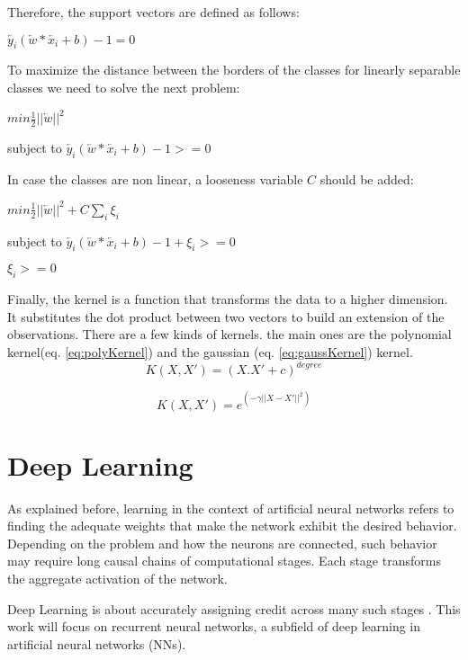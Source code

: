 Therefore, the support vectors are defined as follows: \\
\centerline{$\overleftarrow{y_i} (\overleftarrow{w}*\overleftarrow{x_i}+b)-1=0$\\}

To maximize the distance between the borders of the classes for linearly separable classes we need to solve the next problem:

\centerline{$min \frac{1}{2}||\overleftarrow{w}||^2$\\}
\centerline{subject to $\overleftarrow{y_i} (\overleftarrow{w}*\overleftarrow{x_i}+b)-1>=0$ \\}

In case the classes are non linear, a looseness variable $C$ should be added: \\
\centerline{$min \frac{1}{2}||\overleftarrow{w}||^2+C\sum_{i}\xi_i$\\}
\centerline{subject to $\overleftarrow{y_i} (\overleftarrow{w}*\overleftarrow{x_i}+b)-1+\xi_i>=0$\\}
\centerline{$\xi_i>=0$}

Finally, the kernel is a function that transforms the data to a higher dimension. It substitutes the dot product between two vectors to build an extension of the observations. There are a few kinds of kernels. the main ones are the polynomial kernel(eq. \ref{eq:polyKernel}) and the gaussian (eq. \ref{eq:gaussKernel}) kernel.
\begin{equation} \label{eq:polyKernel}
K(X,X')=(X.X'+c)^{degree}
\end{equation}

\begin{equation} \label{eq:gaussKernel}
K(X,X')=e^{(-\gamma ||X-X'||^2)}
\end{equation}

\section{Deep Learning}
As explained before, learning in the context of artificial neural networks refers to finding the adequate weights that make the network exhibit the desired behavior. Depending on the problem and how the neurons are connected, such behavior may require long causal chains of computational stages. Each stage transforms the aggregate activation of the network.

Deep Learning is about accurately assigning credit across many such stages \cite{schmidhuber2015deep}. This work will focus on recurrent neural networks, a subfield of deep learning in artificial neural networks (NNs).

